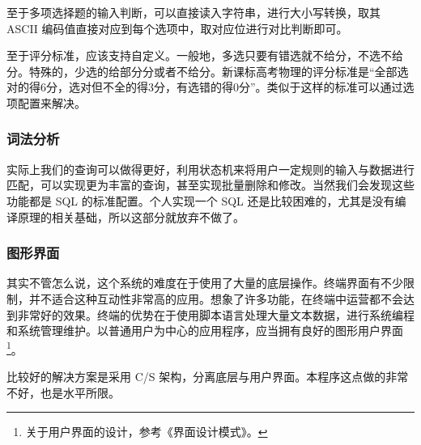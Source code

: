 至于多项选择题的输入判断，可以直接读入字符串，进行大小写转换，取其 ASCII 编码值直接对应到每个选项中，取对应位进行对比判断即可。

至于评分标准，应该支持自定义。一般地，多选只要有错选就不给分，不选不给分。特殊的，少选的给部分分或者不给分。新课标高考物理的评分标准是“全部选对的得6分，选对但不全的得3分，有选错的得0分”。类似于这样的标准可以通过选项配置来解决。

\subsubsection{词法分析}

实际上我们的查询可以做得更好，利用状态机来将用户一定规则的输入与数据进行匹配，可以实现更为丰富的查询，甚至实现批量删除和修改。当然我们会发现这些功能都是 SQL 的标准配置。个人实现一个 SQL 还是比较困难的，尤其是没有编译原理的相关基础，所以这部分就放弃不做了。

\subsubsection{图形界面}

其实不管怎么说，这个系统的难度在于使用了大量的底层操作。终端界面有不少限制，并不适合这种互动性非常高的应用。想象了许多功能，在终端中运营都不会达到非常好的效果。终端的优势在于使用脚本语言处理大量文本数据，进行系统编程和系统管理维护。以普通用户为中心的应用程序，应当拥有良好的图形用户界面\footnote{关于用户界面的设计，参考《界面设计模式》\cite{dinterface}。}。

比较好的解决方案是采用 C/S 架构，分离底层与用户界面。本程序这点做的非常不好，也是水平所限。
